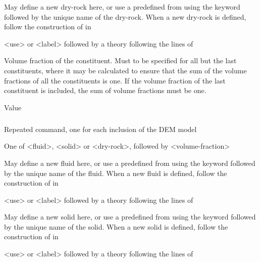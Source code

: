 {
 \slist
   \item \Description  May define a new dry-rock here, or use a predefined  from  using the keyword  followed by the unique name of the dry-rock. When a new dry-rock is defined, follow the construction of  in 
   \item \Argument <use> or <label> followed by a theory following the lines of 
   \item \Default
 \elist

 \slist
   \item \Description Volume fraction of the constituent. Must to be specified for all but the last constituents, where it may be calculated to ensure that the sum of the volume fractions of all the constituents is one. If the volume fraction of the last constituent is included, the sum of volume fractions must be one. 
   \item \Argument Value
   \item \Default
 \elist

\subparagraph{}
 \slist
   \item \Description Repeated command, one for each inclusion of the DEM model
   \item \Argument One of <fluid>, <solid> or <dry-rock>, followed by <volume-fraction>
   \item \Default
 \elist

 \slist
   \item \Description May define a new fluid here, or use a predefined  from  using the keyword  followed by the unique name of the fluid. When a new fluid is defined, follow the construction of  in 
   \item \Argument <use> or <label> followed by a theory following the lines of 
   \item \Default
 \elist

 \slist
   \item \Description May define a new solid here, or use a predefined  from  using the keyword  followed by the unique name of the solid. When a new solid is defined, follow the construction of  in 
   \item \Argument <use> or <label> followed by a theory following the lines of 
   \item \Default
 \elist

}
